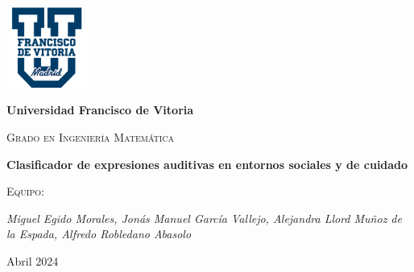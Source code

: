 
\begin{titlepage}
    \begin{center}
        \justify
        \vspace{1cm}
        
        \includegraphics[width=0.2\textwidth]{ImagenesLatex/ufv_logo}
        \vspace{1cm}
        
        \LARGE\textbf{Universidad Francisco de Vitoria}
        \vspace{0.5cm}
        
        \Large\textsc{Grado en Ingeniería Matemática}
        \vspace{1cm}
        
        
        \Huge\textbf{Clasificador de expresiones auditivas en entornos sociales y de cuidado}
        \vspace{7  cm}
        
        \Large\textsc{Equipo:}
        \vspace{0.1cm}

        \Large\textit{
            Miguel Egido Morales, 
            Jonás Manuel García Vallejo,  
            Alejandra Llord Muñoz de la Espada, 
            Alfredo Robledano Abasolo}
        \vspace{1cm}
        
        \Large\textmd{Abril 2024}
        \vfill
        
    \end{center}
\end{titlepage}
